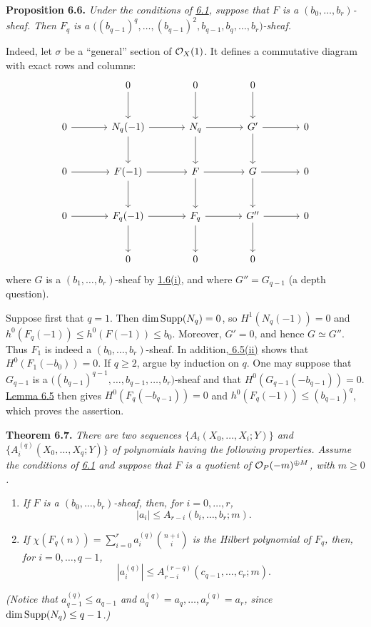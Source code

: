 \textbf{Proposition 6.6.} \emph{Under the conditions of \hyperlink{sga6.e13.para.6-1}{6.1}, suppose
that $F$ is a $(b_0,\ldots,b_r)$-sheaf. Then $F_q$ is a
$\bigl((b_{q-1})^q,\ldots,(b_{q-1})^2,b_{q-1},b_q,\ldots,b_r\bigr)$-sheaf.}

Indeed, let $\sigma$ be a ``general'' section of $\mathcal O_X(1)$. It defines a commutative diagram with exact rows and columns:
\[
\begin{tikzcd}[column sep=large,row sep=large]
&0 \arrow[d]&0 \arrow[d]&0 \arrow[d]&\\
0 \arrow[r]&N_q(-1) \arrow[r] \arrow[d]&N_q \arrow[r] \arrow[d]&G' \arrow[r] \arrow[d]&0\\
0 \arrow[r]&F(-1) \arrow[r] \arrow[d]&F \arrow[r] \arrow[d]&G \arrow[r] \arrow[d]&0\\
0 \arrow[r]&F_q(-1) \arrow[r] \arrow[d]&F_q \arrow[r] \arrow[d]&G'' \arrow[r] \arrow[d]&0\\
&0&0&0&
\end{tikzcd}
\]
where $G$ is a $(b_1,\ldots,b_r)$-sheaf by \hyperlink{sga6.e13.prop.1-6}{1.6(i)}, and where
$G''=G_{q-1}$ (a depth question).

Suppose first that $q=1$. Then $\dim\operatorname{Supp}(N_q)=0$, so
$H^1(N_q(-1))=0$ and $h^0(F_q(-1))\leq h^0(F(-1))\leq b_0$.
Moreover, $G'=0$, and hence $G\simeq G''$. Thus $F_1$ is indeed a $(b_0,\ldots,b_r)$-sheaf. In addition,\hyperlink{sga6.e13.lem.6-5}{ 6.5(ii)} shows that
$H^0(F_1(-b_0))=0$. If $q\geq2$, argue by induction on $q$. One may
suppose that $G_{q-1}$ is a
$\bigl((b_{q-1})^{q-1},\ldots,b_{q-1},\ldots,b_r\bigr)$-sheaf and that
$H^0(G_{q-1}(-b_{q-1}))=0$. \hyperlink{sga6.e13.lem.6-5}{Lemma 6.5} then gives
$H^0(F_q(-b_{q-1}))=0$ and $h^0(F_q(-1))\leq(b_{q-1})^q$,
which proves the assertion.

\textbf{Theorem 6.7.} \emph{There are two sequences
$\{A_i(X_0,\ldots,X_i;Y)\}$ and
$\{A_i^{(q)}(X_0,\ldots,X_q;Y)\}$ of polynomials having the following
properties. Assume the conditions of \hyperlink{sga6.e13.para.6-1}{6.1} and suppose that $F$ is a
quotient of $\mathcal O_P(-m)^{\oplus M}$, with $m\geq0$.}
\begin{enumerate}[label=(\roman*)]
\item \emph{If $F$ is a $(b_0,\ldots,b_r)$-sheaf, then, for
$i=0,\ldots,r$,}
\[
  |a_i|\leq A_{r-i}(b_i,\ldots,b_r;m).
\]
\item \emph{If
$\chi(F_q(n))=\sum_{i=0}^{r}a_i^{(q)}\binom{n+i}{i}$ is the Hilbert
polynomial of $F_q$, then, for $i=0,\ldots,q-1$,}
\[
  |a_i^{(q)}|\leq A_{r-i}^{(r-q)}(c_{q-1},\ldots,c_r;m).
\]
\end{enumerate}
\emph{(Notice that $a_{q-1}^{(q)}\leq a_{q-1}$ and
$a_q^{(q)}=a_q,\ldots,a_r^{(q)}=a_r$, since
$\dim\operatorname{Supp}(N_q)\leq q-1$.)}

